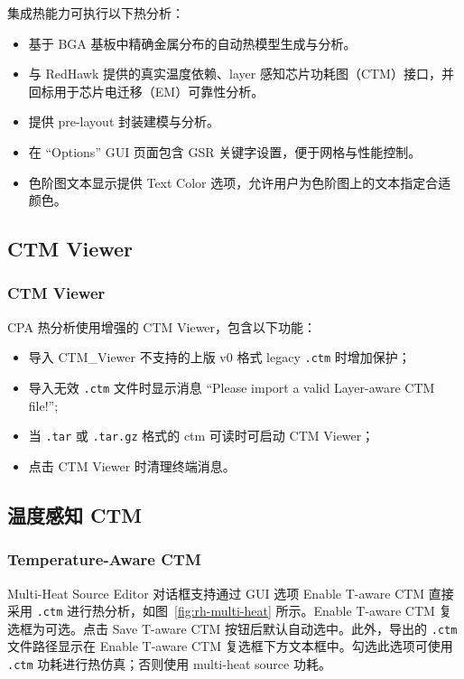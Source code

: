 \label{fig:rh-cpa-ctm-gui}

\label{fig:rh-chip-pkg-temp}

集成热能力可执行以下热分析：
\begin{itemize}
  \item 基于 BGA 基板中精确金属分布的自动热模型生成与分析。
  \item 与 RedHawk 提供的真实温度依赖、layer 感知芯片功耗图（CTM）接口，并回标用于芯片电迁移（EM）可靠性分析。
  \item 提供 pre-layout 封装建模与分析。
  \item 在 ``Options'' GUI 页面包含 GSR 关键字设置，便于网格与性能控制。
  \item 色阶图文本显示提供 Text Color 选项，允许用户为色阶图上的文本指定合适颜色。
\end{itemize}

\subsection{CTM Viewer}
\subsubsection*{CTM Viewer}

CPA 热分析使用增强的 CTM Viewer，包含以下功能：
\begin{itemize}
  \item 导入 CTM\_Viewer 不支持的上版 v0 格式 legacy \texttt{.ctm} 时增加保护；
  \item 导入无效 \texttt{.ctm} 文件时显示消息 ``Please import a valid Layer-aware CTM file!'';
  \item 当 \texttt{.tar} 或 \texttt{.tar.gz} 格式的 ctm 可读时可启动 CTM Viewer；
  \item 点击 CTM Viewer 时清理终端消息。
\end{itemize}

\subsection{温度感知 CTM}
\subsubsection*{Temperature-Aware CTM}

Multi-Heat Source Editor 对话框支持通过 GUI 选项 Enable T-aware CTM 直接采用 \texttt{.ctm} 进行热分析，如图~\ref{fig:rh-multi-heat} 所示。Enable T-aware CTM 复选框为可选。点击 Save T-aware CTM 按钮后默认自动选中。此外，导出的 \texttt{.ctm} 文件路径显示在 Enable T-aware CTM 复选框下方文本框中。勾选此选项可使用 \texttt{.ctm} 功耗进行热仿真；否则使用 multi-heat source 功耗。

